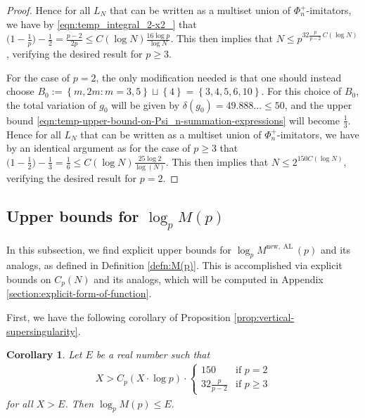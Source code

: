 \documentclass[11pt,letterpaper,reqno]{amsart}
\newtheorem{corollary}[theorem]{Corollary}
\theoremstyle{definition}
\numberwithin{equation}{section}
\numberwithin{figure}{section}
\numberwithin{table}{section}
\let\subsectiontemp\subsection
\renewcommand{\subsection}[1]{ 
    \subsectiontemp{#1} \hfill\vspace{0.5\linespacing} 
}
\newcommand{\lrcb}[1]{\!\left\{#1\right\}}
\newcommand{\nw}{\mathrm{new}}
\begin{document}
\begin{proof}
    Hence for all $L_N$ that can be written as a multiset union of $\Phi_n^+$-imitators, we have by \eqref{eqn:temp_integral_2-x2_} that $\big(1-\frac{1}{p}\big) - \frac{1}{2} = \frac{p-2}{2p} \le C(\log N)\frac{16 \log p}{\log N}$. This then implies that
    $
        N \le p^{32 \frac{p}{p-2} \, C(\log N)}
    $,
    verifying the desired result for $p \ge 3$.

    For the case of $p=2$, the only modification needed is that one should instead choose $B_0 := \lrcb{m,2m : m=3,5} \sqcup \lrcb{4} = \lrcb{3,4,5,6,10}$. For this choice of $B_0$, the total variation of $g_0$ will be given by $\delta(g_0) = 49.888... \le 50$, and the upper bound \eqref{eqn:temp-upper-bound-on-Psi_n-summation-expressions} will become $\frac{1}{3}$.
    Hence for all $L_N$ that can be written as a multiset union of $\Phi_n^+$-imitators, we have by an identical argument as for the case of $p \ge 3$ that $\big(1-\frac{1}{2}\big) - \frac{1}{3} = \frac{1}{6} \le C(\log N) \frac{25 \log 2}{\log(N)}$. This then implies that
    $
        N \le 2^{150 C(\log N)}
    $,
    verifying the desired result for $p = 2$.
\end{proof}










\subsection{Upper bounds for \texorpdfstring{$\log_p M(p)$}{log p M(p)}}\label{subsection:explicit-bounds-on-M}


In this subsection, we find explicit upper bounds for $\log_p M^{\nw, \operatorname{AL}}(p)$ and its analogs, as defined in Definition \ref{defn:M(p)}. This is accomplished via explicit bounds on $C_p(N)$ and its analogs, which will be computed in Appendix \ref{section:explicit-form-of-function}.



First, we have the following corollary of Proposition \ref{prop:vertical-supersingularity}.

\begin{corollary}\label{cor:E(p)-relation}
    Let $E$ be a real number such that
    \begin{align}
        X > C_p\left( X \cdot \log p  \right) \cdot 
        \begin{cases}
            150 & \text{if } p = 2\\
            32 \frac{p}{p - 2} 
            & \text{if }
            p \ge 3
        \end{cases} \label{eqn:E(p)-relation}
    \end{align}
    for all $X > E$. Then $\log_p M(p) \leq E.$
\end{corollary}
\end{document}

